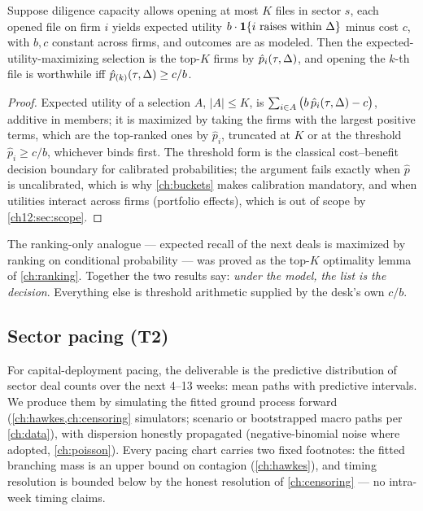 \begin{proposition}\label{prop:ch12:topk}
Suppose diligence capacity allows opening at most $K$ files in sector
$s$, each opened file on firm $i$ yields expected utility $b \cdot
\mathbf{1}\{i \text{ raises within } \Delta\}$ minus cost $c$, with $b, c$
constant across firms, and outcomes are as modeled. Then the expected-utility-maximizing
selection is the top-$K$ firms by $\hat p_i(\tau,\Delta)$, and opening
the $k$-th file is worthwhile iff $\hat p_{(k)}(\tau,\Delta) \ge c/b$.
\end{proposition}

\begin{proof}
Expected utility of a selection $A$, $|A| \le K$, is $\sum_{i \in A}
\big(b\, \hat p_i(\tau,\Delta) - c\big)$, additive in members; it is
maximized by taking the firms with the largest positive terms, which are
the top-ranked ones by $\hat p_i$, truncated at $K$ or at the threshold
$\hat p_i \ge c/b$, whichever binds first. The threshold form is the
classical cost--benefit decision boundary for calibrated probabilities;
the argument fails exactly when $\hat p$ is uncalibrated, which is why
\cref{ch:buckets} makes calibration mandatory, and when utilities
interact across firms (portfolio effects), which is out of scope by
\cref{ch12:sec:scope}.
\end{proof}

The ranking-only analogue --- expected recall of the next deals is
maximized by ranking on conditional probability --- was proved as the
top-$K$ optimality lemma of \cref{ch:ranking}. Together the two results
say: \emph{under the model, the list is the decision}. Everything else
is threshold arithmetic supplied by the desk's own $c/b$.

\subsection{Sector pacing (T2)}

For capital-deployment pacing, the deliverable is the predictive
distribution of sector deal counts over the next 4--13 weeks: mean paths
with predictive intervals. We produce them by simulating the fitted ground
process forward (\cref{ch:hawkes,ch:censoring} simulators; scenario or
bootstrapped macro paths per \cref{ch:data}), with dispersion honestly
propagated (negative-binomial noise where adopted, \cref{ch:poisson}).
Every pacing chart carries two fixed footnotes: the
fitted branching mass is an upper bound on contagion
(\cref{ch:hawkes}), and timing resolution is bounded below by the honest
resolution of \cref{ch:censoring} --- no intra-week timing claims.

